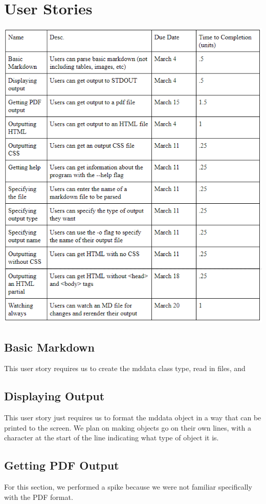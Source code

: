 \section{User Stories}

\includegraphics[width=400pt]{images/UserStoriesTable.png}

\subsection{Basic Markdown}
This user story requires us to create the mddata class type, read in files, and 

\subsection{Displaying Output}
This user story just requires us to format the mddata object in a way that can be printed to the screen.
We plan on making objects go on their own lines, with a character at the start of the line indicating what type of object it is.

\subsection{Getting PDF Output}
For this section, we performed a spike because we were not familiar specifically with the PDF format.

